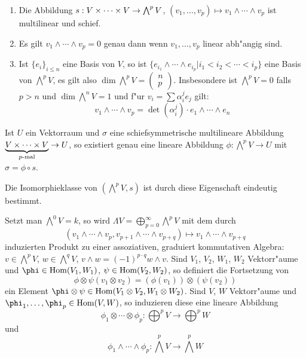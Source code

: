\begin{emptythm}[Eigenschaften:]
  \begin{enumerate}[label=(\arabic*),leftmargin=*]
  \item Die Abbildung $s: V \times \cdots \times V \to \bigwedge^p V$, $(v_1, \ldots ,v_p) \mapsto v_1 \wedge \cdots \wedge v_p$ ist multilinear und schief.
  \item Es gilt $v_1 \wedge \cdots \wedge v_p = 0$ genau dann wenn $v_1, \ldots , v_p$ linear abh"angig sind.
  \item Ist $\{e_i\}_{i \le n}$ eine Basis von $V$, so ist $\{e_{i_1} \wedge \cdots \wedge e_{i_p} | i_1 < i_2 < \cdots < i_p\}$ eine Basis von $\bigwedge^pV$, es gilt also $\dim \bigwedge^pV = \left( \begin{smallmatrix} n \\ p \end{smallmatrix} \right)$.
    Insbesondere ist $\bigwedge^pV = 0$ falls $p > n$ und $\dim \bigwedge^nV = 1$ und f"ur $v_i = \sum \alpha_i^j e_j$ gilt:
    \[ v_1 \wedge \cdots \wedge v_p = \det (\alpha_i^j) \cdot e_1 \wedge \cdots \wedge e_n \]
  \end{enumerate}
\end{emptythm}

\begin{emptythm}
Ist $U$ ein Vektorraum und $\sigma$ eine schiefsymmetrische multilineare Abbildung $\underbrace{V \times \cdots \times V}_{p\text{-mal}} \to U$, so existiert genau eine lineare Abbildung $\phi: \bigwedge^pV \to U$ mit $\sigma = \phi \circ s$.
\begin{center}\end{center}
Die Isomorphieklasse von $(\bigwedge^pV, s)$ ist durch diese Eigenschaft eindeutig bestimmt.
\end{emptythm}

Setzt man $\bigwedge^0V = k$, so wird $\Lambda V = \bigoplus_{p=0}^{\infty}\bigwedge^pV$ mit dem durch
	\[ (v_1 \wedge \cdots \wedge v_p, v_{p+1} \wedge \cdots \wedge v_{p+q}) \mapsto v_1 \wedge \cdots \wedge v_{p+q} \]
induzierten Produkt zu einer assoziativen, graduiert kommutativen Algebra: $v \in \bigwedge^pV$, $w \in \bigwedge^qV$, $v \wedge w = (-1)^{p \cdot q} w \wedge v$. Sind $V_1$, $V_2$, $W_1$, $W_2$ Vektorr"aume und $\phi \in \Hom(V_1, W_1)$, $\psi \in \operatorname{Hom}(V_2, W_2)$, so definiert die Fortsetzung von 
	\[ \phi \otimes \psi (v_1 \otimes v_2) = (\phi(v_1)) \otimes (\psi(v_2)) \]
ein Element $\phi \otimes \psi \in \Hom(V_1 \otimes V_2, W_1 \otimes W_2)$. Sind $V$, $W$ Vektorr"aume und $\phi_1,\ldots ,\phi_p \in \Hom(V, W)$, so induzieren diese eine lineare Abbildung
	\[ \phi_1 \otimes \cdots \otimes \phi_p : \bigoplus^p V \to \bigoplus^p W \]
und
	\[ \phi_1 \wedge \cdots  \wedge \phi_p : \bigwedge^pV \to \bigwedge^pW \]


